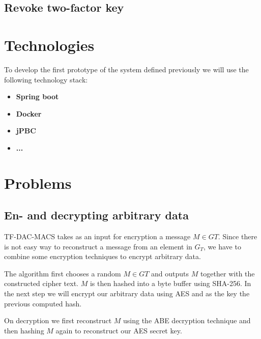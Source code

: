 \subsection{Revoke two-factor key}



\section{Technologies}
To develop the first prototype of the system defined previously we will use the following technology stack:

\begin{itemize}
  \item \textbf{Spring boot}
  \item \textbf{Docker}
  \item \textbf{jPBC} \cite{ISCC:DecIov11}
  \item \textbf{...}
\end{itemize}

\section{Problems}

\subsection{En- and decrypting arbitrary data}
TF-DAC-MACS takes as an input for encryption a message $M \in GT$. Since there is not easy way to reconstruct a message from an element in $G_T$, we have to combine some encryption techniques to encrypt arbitrary data. 

The algorithm first chooses a random $M \in GT$ and outputs $M$ together with the constructed cipher text. $M$ is then hashed into a byte buffer using \ac{SHA}-256. In the next step we will encrypt our arbitrary data using \ac{AES} and as the key the previous computed hash. 

On decryption we first reconstruct $M$ using the ABE decryption technique and then hashing $M$ again to reconstruct our AES secret key. 